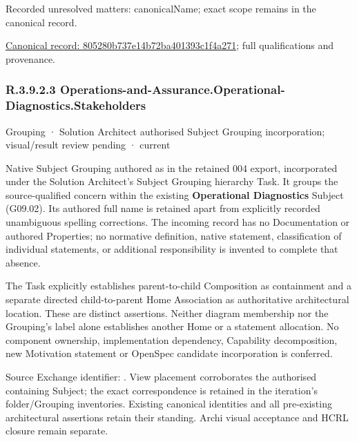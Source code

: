 {\small Recorded unresolved matters: canonicalName; exact scope remains in the canonical record.}\par
{\footnotesize \href{../../../../continuum/grouping/805280b737e14b72ba401393c1f4a271.md}{Canonical record: 805280b737e14b72ba401393c1f4a271}; full qualifications and provenance.}\par
\subsubsection*{R.3.9.2.3 Operations-and-Assurance.Operational-Diagnostics.Stakeholders}
\label{navigation:R.3.9.2.3}

\label{element:67bfa710070c4618b3ba834da62cc63d}
{\small Grouping · Solution Architect authorised Subject Grouping incorporation; visual/result review pending · current}\par

Native Subject Grouping authored as \texttt{} in the retained 004 export,
incorporated under the Solution Architect's Subject Grouping hierarchy Task.
It groups the source-qualified \texttt{} concern within
the existing \textbf{Operational Diagnostics} Subject (G09.02). Its authored full name
is retained apart from explicitly recorded unambiguous spelling corrections.
The incoming record has no Documentation or authored Properties; no normative
definition, native statement, classification of individual statements, or
additional responsibility is invented to complete that absence.



The Task explicitly establishes parent-to-child Composition as containment and
a separate directed child-to-parent Home Association as authoritative architectural
location. These are distinct assertions. Neither diagram membership nor the
Grouping's label alone establishes another Home or a statement allocation.
No component ownership, implementation dependency, Capability decomposition,
new Motivation statement or OpenSpec candidate incorporation is conferred.



Source Exchange identifier: \texttt{}. View placement corroborates
the authorised containing Subject; the exact correspondence is retained in the
iteration's folder/Grouping inventories. Existing canonical identities and all
pre-existing architectural assertions retain their standing. Archi visual
acceptance and HCRL closure remain separate.


